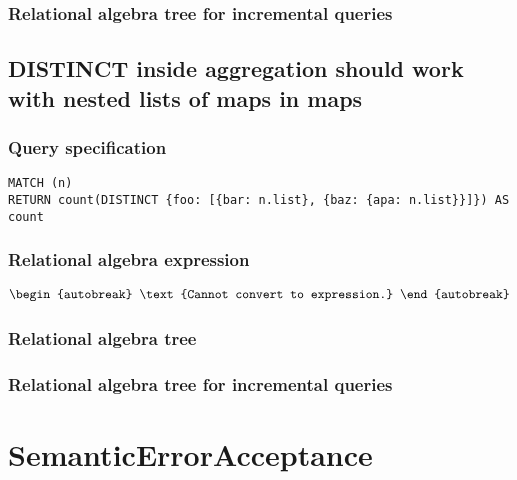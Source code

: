 \subsubsection*{Relational algebra tree for incremental queries}


\subsection{DISTINCT inside aggregation should work with nested lists of maps in maps}

\subsubsection*{Query specification}

\begin{lstlisting}
MATCH (n)
RETURN count(DISTINCT {foo: [{bar: n.list}, {baz: {apa: n.list}}]}) AS count
\end{lstlisting}

\subsubsection*{Relational algebra expression}

\begin{align*}
\begin{autobreak}
\text{Cannot convert to expression.}
\end{autobreak}
\end{align*}

\subsubsection*{Relational algebra tree}


\subsubsection*{Relational algebra tree for incremental queries}

\section{SemanticErrorAcceptance}


